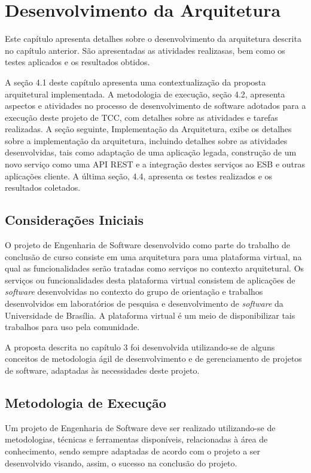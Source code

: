 \chapter[Desenvolvimento da Arquitetura]{Desenvolvimento da Arquitetura}

Este capítulo apresenta detalhes sobre o desenvolvimento da arquitetura descrita no capítulo anterior. São apresentadas as atividades realizasas, bem como os testes aplicados e os resultados obtidos.

A seção 4.1 deste capítulo apresenta uma contextualização da proposta arquitetural implementada. A metodologia de execução, seção 4.2, apresenta aspectos e atividades no processo de desenvolvimento de software adotados para a execução deste projeto de TCC, com detalhes sobre as atividades  e tarefas realizadas. A seção seguinte, Implementação da Arquitetura, exibe os detalhes sobre a implementação da arquitetura, incluindo detalhes sobre as atividades desenvolvidas, tais como adaptação de uma aplicação legada, construção de um novo serviço como uma API REST e a integração destes serviços ao ESB e outras aplicações cliente. A última seção, 4.4, apresenta os testes realizados e os resultados coletados.

\section{Considerações Iniciais}
O projeto de Engenharia de Software desenvolvido como parte do trabalho de conclusão de curso consiste em uma arquitetura para uma plataforma virtual, na qual as funcionalidades serão tratadas como serviços no contexto arquitetural. Os serviços ou funcionalidades desta plataforma virtual consistem de aplicações de \textit{software} desenvolvidas no contexto do grupo de orientação e trabalhos desenvolvidos em laboratórios de pesquisa e desenvolvimento de \textit{software} da Universidade de Brasília. A plataforma virtual é um meio de disponibilizar tais trabalhos para uso pela comunidade.

A proposta descrita no capítulo 3 foi desenvolvida utilizando-se de alguns conceitos de metodologia ágil de desenvolvimento e de gerenciamento de projetos de software, adaptadas às necessidades deste projeto.

\section{Metodologia de Execução}
Um projeto de Engenharia de Software deve ser realizado utilizando-se de metodologias, técnicas e ferramentas disponíveis, relacionadas à área de conhecimento, sendo sempre adaptadas de acordo com o projeto a ser desenvolvido visando, assim, o sucesso na conclusão do projeto.

